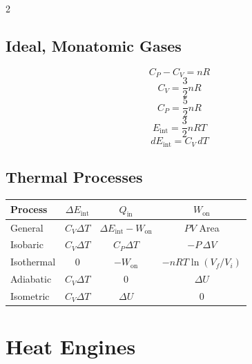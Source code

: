 \begin{multicols*}{2}
\subsection{Ideal, Monatomic Gases}
\begin{equation*}
    C_P - C_V = n R
\end{equation*}
\begin{equation*}
    C_V = \frac32 n R
\end{equation*}
\begin{equation*}
    C_P = \frac52 n R
\end{equation*}
\begin{equation*}
    E_\mathrm{int} = \frac32 nRT
\end{equation*}
\begin{equation*}
    dE_\mathrm{int} = C_V\, dT
\end{equation*}

\subsection{Thermal Processes}
\begin{tabular}{lccc}
    \hline
    Process     & $\Delta E_\mathrm{int}$   & $Q_\mathrm{in}$   & $W_\mathrm{on}$                   \\
    \hline
    General     & $C_V \Delta T$            & $\Delta E_\mathrm{int} - W_\mathrm{on}$  & $PV$ Area               \\
    Isobaric    & $C_V \Delta T$            & $C_P \Delta T$    & $-P\,\Delta V$                    \\
    Isothermal  & 0                         & $-W_\mathrm{on}$  & $-nRT \ln\left(V_f/V_i\right)$    \\
    Adiabatic   & $C_V \Delta T$            & 0                 & $\Delta U$                        \\
    Isometric   & $C_V \Delta T$            & $\Delta U$        & 0                                 \\
    \hline
\end{tabular}

\section{Heat Engines}


\end{multicols*}
